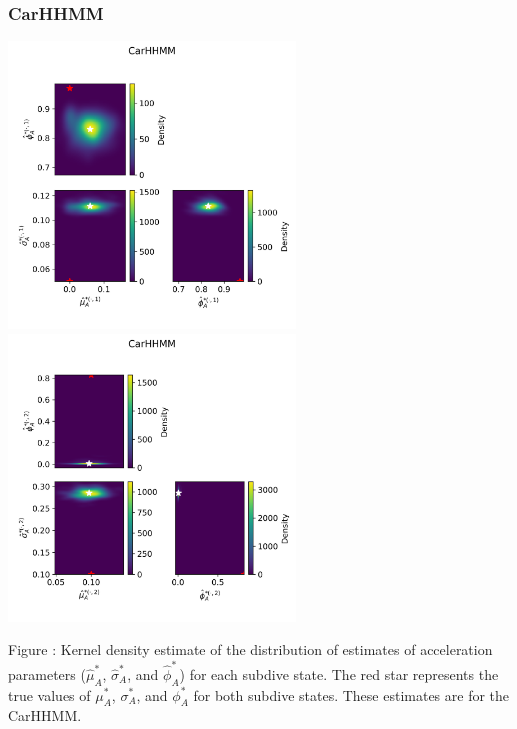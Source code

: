 \documentclass{article}
\begin{document}
        \subsubsection{CarHHMM}
        \begin{center}
        \includegraphics[width=3in]{../Plots/hhmm_V_MLE_density_A_0_0.png}
        \includegraphics[width=3in]{../Plots/hhmm_V_MLE_density_A_0_1.png}
        \end{center}
        
        \noindent Figure : Kernel density estimate of the distribution of estimates of acceleration parameters ($\hat \mu^*_A$, $\hat \sigma^*_A$, and $\hat \phi^*_A$) for each subdive state. The red star represents the true values of $\mu^*_A$, $\sigma^*_A$, and $\phi^*_A$ for both subdive states. These estimates are for the CarHHMM. 
        \addtocounter{fignum}{1}
        
\end{document}
